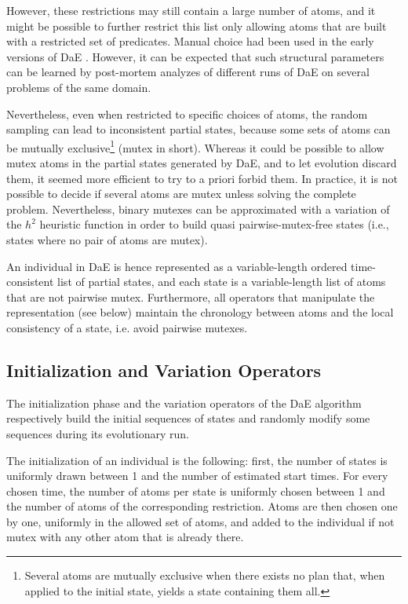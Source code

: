 \documentclass{acm_proc_article-sp}
\begin{document}
However, these restrictions may still contain a large number of atoms, and it might be possible to further restrict this list only allowing atoms that are built with a restricted set of predicates. Manual choice had been used in the early versions of DaE \cite{deterministic:IPC6}. However, it can be expected that such structural parameters can be learned by post-mortem analyzes of different runs of DaE on several problems of the same domain. 

Nevertheless, even when restricted to specific choices of atoms, the random sampling can lead to inconsistent partial states, because some sets of atoms can be mutually exclusive\footnote{Several atoms are mutually exclusive when there exists no plan that, when applied to the initial state, yields a state containing them all.} (mutex in short). Whereas it could be possible to allow mutex atoms in the partial states generated by DaE, and to let evolution discard them, it seemed more efficient to try to a priori forbid them. In practice, it is not possible to decide if several atoms are mutex unless solving the complete problem. Nevertheless, binary mutexes can be approximated with a variation of the $h^2$ heuristic function \cite{HaslumGeffner-AIPS-2000} in order to build quasi pairwise-mutex-free states (i.e., states where no pair of atoms are mutex).

An individual in DaE is hence represented as a variable-length ordered time-consistent list of partial states, and each state is a variable-length list of atoms that are not pairwise mutex. Furthermore, all operators that manipulate the representation (see below) maintain the chronology between atoms and the local consistency of a state, i.e. avoid pairwise mutexes.


\subsection{Initialization and Variation Operators}
\label{section:operators}

The initialization phase and the variation operators of the DaE algorithm respectively build the initial sequences of states and randomly modify some sequences during its evolutionary run.

The initialization of an individual is the following: first, the number of states is uniformly drawn between 1 and the number of estimated start times.  For every chosen time, the number of atoms per state is uniformly chosen between 1 and the number of atoms of the corresponding restriction. Atoms are then chosen one by one, uniformly in the allowed set of atoms, and added to the individual if not mutex with any other atom that is already there.
\end{document}
